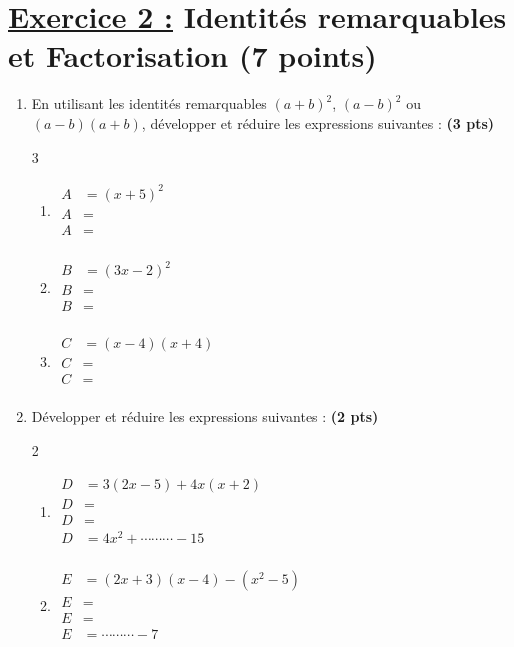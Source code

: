\documentclass[12pt,a4paper]{article}
\begin{document}
\section*{\underline{Exercice 2 :} Identités remarquables et Factorisation (7 points)}

\begin{enumerate}
    \item En utilisant les identités remarquables $(a+b)^2$, $(a-b)^2$ ou $(a-b)(a+b)$, développer et réduire les expressions suivantes : \textbf{(3 pts)}

\begin{multicols}{3}
\setlength{\columnseprule}{0.1mm}
\begin{enumerate}
\item[]
\(
\begin{aligned}
A&=(x + 5)^2 \\[0.5cm]
A&= \\[0.5cm]
A&= \\
\end{aligned}
\)
\item[]
\(
\begin{aligned}
B&=(3x - 2)^2\\[0.5cm]
B&=\\[0.5cm]
B&=\\
\end{aligned}
\)
\item[]
\(
\begin{aligned}
C&=(x - 4)(x + 4)\\[0.5cm]
C&=\\[0.5cm]
C&=\\
\end{aligned}
\)
\end{enumerate}
\end{multicols} 
    
\item Développer et réduire les expressions suivantes : \textbf{(2 pts)}
 \begin{multicols}{2}
\setlength{\columnseprule}{0.1mm}
\begin{enumerate}
\item[]
\(
\begin{aligned}
D&=3(2x - 5) + 4x(x + 2)\\[0.5cm]
D&=\\[0.5cm]
D&=\\[0.5cm]
D&=4x^2 +\cdots\cdots\cdots - 15\\
\end{aligned}
\)
\item[]
\(
\begin{aligned}
E&=(2x + 3)(x - 4) - (x^2 - 5)\\[0.5cm]
E&=\\[0.5cm]
E&=\\[0.5cm]
E&=\cdots\cdots\cdots - 7\\
\end{aligned}
\)
\end{enumerate}
\end{multicols}


\end{enumerate}
\end{document}
